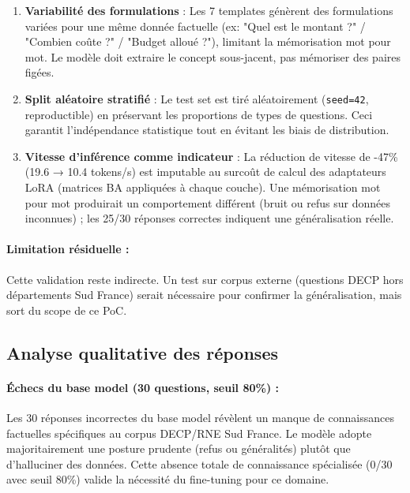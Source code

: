 \begin{enumerate}
    \item \textbf{Variabilité des formulations} : Les 7 templates génèrent des formulations variées pour une même donnée factuelle (ex: "Quel est le montant ?" / "Combien coûte ?" / "Budget alloué ?"), limitant la mémorisation mot pour mot. Le modèle doit extraire le concept sous-jacent, pas mémoriser des paires figées.
    
    \item \textbf{Split aléatoire stratifié} : Le test set est tiré aléatoirement (\texttt{seed=42}, reproductible) en préservant les proportions de types de questions. Ceci garantit l'indépendance statistique tout en évitant les biais de distribution.
    
    \item \textbf{Vitesse d'inférence comme indicateur} : La réduction de vitesse de -47\% (19.6 → 10.4 tokens/s) est imputable au surcoût de calcul des adaptateurs LoRA (matrices BA appliquées à chaque couche). Une mémorisation mot pour mot produirait un comportement différent (bruit ou refus sur données inconnues) ; les 25/30 réponses correctes indiquent une généralisation réelle.
\end{enumerate}

\paragraph{Limitation résiduelle :}
Cette validation reste indirecte. Un test sur corpus externe (questions DECP hors départements Sud France) serait nécessaire pour confirmer la généralisation, mais sort du scope de ce PoC.

\subsection{Analyse qualitative des réponses}

\paragraph{Échecs du base model (30 questions, seuil 80\%) :}
Les 30 réponses incorrectes du base model révèlent un manque de connaissances factuelles spécifiques au corpus DECP/RNE Sud France. Le modèle adopte majoritairement une posture prudente (refus ou généralités) plutôt que d'halluciner des données. Cette absence totale de connaissance spécialisée (0/30 avec seuil 80\%) valide la nécessité du fine-tuning pour ce domaine.

